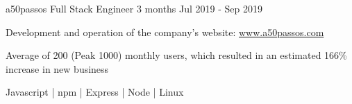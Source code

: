 \begin{cventries}
\cventry
  {a50passos} %
  {Full Stack Engineer} %
  {3 months} %
  {Jul 2019 - Sep 2019} %
  {
    \begin{cvitems}
      \item{Development and operation of the company's website: \href{https://www.a50passos.com}{www.a50passos.com}}
      \item{Average of 200 (Peak 1000) monthly users, which resulted in an estimated 166\% increase in new business}
    \end{cvitems}
  }
  {Javascript | npm | Express | Node | Linux}

\end{cventries}
